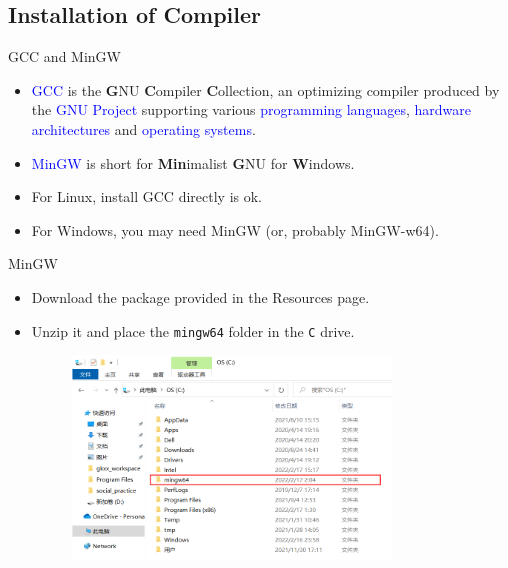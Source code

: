 \documentclass[handout]{beamer}
\newcommand{\blue}[1]{\textcolor{blue}{#1}}
\begin{document}
\subsection{Installation of Compiler}

\begin{frame}{GCC and MinGW}
    \begin{itemize}
        \item \blue{GCC} is the \textbf{G}NU \textbf{C}ompiler \textbf{C}ollection, an optimizing compiler produced by the \blue{GNU Project} supporting various \blue{programming languages}, \blue{hardware architectures} and \blue{operating systems}.
        \item \blue{MinGW} is short for \textbf{Min}imalist \textbf{G}NU for \textbf{W}indows.
        \pause
        \item For Linux, install GCC directly is ok.
        \item For Windows, you may need MinGW (or, probably MinGW-w64).
    \end{itemize}
\end{frame}

\begin{frame}{MinGW}
    \begin{itemize}
        \item Download the package provided in the Resources page.
        \item Unzip it and place the \texttt{mingw64} folder in the \texttt{C} drive.
        \begin{figure}[h]
            \centering
            \includegraphics[width=0.8\textwidth]{figures/mingw_in_c.png}
        \end{figure}
    \end{itemize}
\end{frame}
\end{document}
